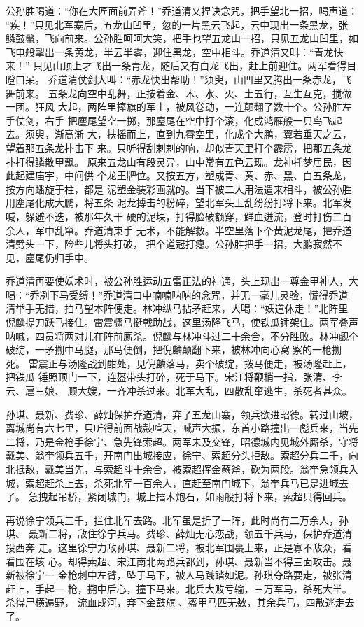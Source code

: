 公孙胜喝道：“你在大匠面前弄斧！”乔道清又捏诀念咒，把手望北一招，喝声道：
“疾！”只见北军寨后，五龙山凹里，忽的一片黑云飞起，云中现出一条黑龙，张
鳞鼓鬣，飞向前来。公孙胜呵呵大笑，把手也望五龙山一招，只见五龙山凹里，如
飞电般掣出一条黄龙，半云半雾，迎住黑龙，空中相斗。乔道清又叫：“青龙快来！”
只见山顶上才飞出一条青龙，随后又有白龙飞出，赶上前迎住。两军看得目瞪口呆。
乔道清仗剑大叫：“赤龙快出帮助！”须臾，山凹里又腾出一条赤龙，飞舞前来。
五条龙向空中乱舞，正按着金、木、水、火、土五行，互生互克，搅做一团。狂风
大起，两阵里捧旗的军士，被风卷动，一连颠翻了数十个。公孙胜左手仗剑，右手
把麈尾望空一掷，那麈尾在空中打个滚，化成鸿雁般一只鸟飞起去。须臾，渐高渐
大，扶摇而上，直到九霄空里，化成个大鹏，翼若垂天之云，望着那五条龙扑击下
来。只听得刮剌剌的响，却似青天里打个霹雳，把那五条龙扑打得鳞散甲飘。
原来五龙山有段灵异，山中常有五色云现。龙神托梦居民，因此起建庙宇，中间供
个龙王牌位。又按五方，塑成青、黄、赤、黑、白五条龙，按方向蟠旋于柱，都是
泥塑金装彩画就的。当下被二人用法遣来相斗，被公孙胜用麈尾化成大鹏，将五条
泥龙搏击的粉碎，望北军头上乱纷纷打将下来。北军发喊，躲避不迭，被那年久干
硬的泥块，打得脸破额穿，鲜血迸流，登时打伤二百余人，军中乱窜。乔道清束手
无术，不能解救。半空里落下个黄泥龙尾，把乔道清劈头一下，险些儿将头打破，
把个道冠打瘪。公孙胜把手一招，大鹏寂然不见，麈尾仍归手中。

乔道清再要使妖术时，被公孙胜运动五雷正法的神通，头上现出一尊金甲神人，大
喝：“乔冽下马受缚！”乔道清口中喃喃呐呐的念咒，并无一毫儿灵验，慌得乔道
清举手无措，拍马望本阵便走。林冲纵马拈矛赶来，大喝：“妖道休走！”北阵里
倪麟提刀跃马接住。雷震骤马挺戟助战，这里汤隆飞马，使铁瓜锤架住。两军叠声
呐喊，四员将两对儿在阵前厮杀。倪麟与林冲斗过二十余合，不分胜败。林冲觑个
破绽，一矛搠中马腿，那马便倒，把倪麟颠翻下来，被林冲向心窝察的一枪搠死。
雷震正与汤隆战到酣处，见倪麟落马，卖个破绽，拨马便走，被汤隆赶上，把铁瓜
锤照顶门一下，连盔带头打碎，死于马下。宋江将鞭梢一指，张清、李云、扈三娘、
顾大嫂，一齐冲杀过来。北军大乱，四散乱窜逃生，杀死者甚众。

孙琪、聂新、费珍、薛灿保护乔道清，弃了五龙山寨，领兵欲进昭德。转过山坡，
离城尚有六七里，只听得前面战鼓喧天，喊声大振，东首小路撞出一彪兵来，当先
二将，乃是金枪手徐宁、急先锋索超。两军未及交锋，昭德城内见城外厮杀，守将
戴美、翁奎领兵五千，开南门出城接应，徐宁、索超分头拒敌。索超分兵二千，向
北抵敌，戴美当先，与索超斗十余合，被索超挥金蘸斧，砍为两段。翁奎急领兵入
城，索超赶杀上去，杀死北军一百余人，直赶至南门城下，翁奎兵马已是进城去了。
急拽起吊桥，紧闭城门，城上擂木炮石，如雨般打将下来，索超只得回兵。

再说徐宁领兵三千，拦住北军去路。北军虽是折了一阵，此时尚有二万余人，孙琪、
聂新二将，敌住徐宁兵马。费珍、薛灿无心恋战，领五千兵马，保护乔道清投西奔
走。这里徐宁力敌孙琪、聂新二将，被北军围裹上来，正是寡不敌众，看看围在垓
心。却得索超、宋江南北两路兵都到，孙琪、聂新当不得三面攻击。聂新被徐宁一
金枪刺中左臂，坠于马下，被人马践踏如泥。孙琪夺路要走，被张清赶上，手起一
枪，搠中后心，撞下马来。北兵大败亏输，三万军马，杀死大半。杀得尸横遍野，
流血成河，弃下金鼓旗、盔甲马匹无数，其余兵马，四散逃走去了。

